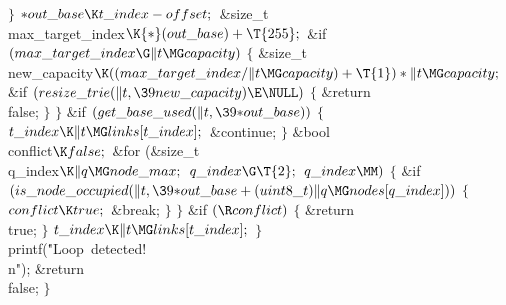\4${}\}{}$\2\6
${}{*}\\{out\_base}\K\\{t\_index}-\\{offset};{}$\7
\&{size\_t} \\{max\_target\_index}${}\K{*}(\\{out\_base})+\T{255};{}$\7
\&{if} ${}(\\{max\_target\_index}\G\|t\MG\\{capacity}){}$\5
${}\{{}$\1\6
\&{size\_t} \\{new\_capacity}${}\K((\\{max\_target\_index}/\|t\MG\\{capacity})+%
\T{1})*\|t\MG\\{capacity};{}$\7
\&{if} ${}(\\{resize\_trie}(\|t,\39\\{new\_capacity})\E\NULL){}$\5
${}\{{}$\1\6
\&{return} \\{false};\6
\4${}\}{}$\2\6
\4${}\}{}$\2\6
\&{if} ${}(\\{get\_base\_used}(\|t,\39{*}\\{out\_base})){}$\5
${}\{{}$\1\6
${}\\{t\_index}\K\|t\MG\\{links}[\\{t\_index}];{}$\6
\&{continue};\6
\4${}\}{}$\2\7
\&{bool} \\{conflict}${}\K\\{false};{}$\7
\&{for} (\&{size\_t} \\{q\_index}${}\K\|q\MG\\{node\_max};{}$ ${}\\{q\_index}\G%
\T{2};{}$ ${}\\{q\_index}\MM){}$\5
${}\{{}$\1\6
\&{if} ${}(\\{is\_node\_occupied}(\|t,\39{*}\\{out\_base}+(\\{uint8\_t})\|q\MG%
\\{nodes}[\\{q\_index}])){}$\5
${}\{{}$\1\6
${}\\{conflict}\K\\{true};{}$\6
\&{break};\6
\4${}\}{}$\2\6
\4${}\}{}$\2\6
\&{if} ${}(\R\\{conflict}){}$\5
${}\{{}$\1\6
\&{return} \\{true};\6
\4${}\}{}$\2\6
${}\\{t\_index}\K\|t\MG\\{links}[\\{t\_index}];{}$\6
\4${}\}{}$\2\6
\\{printf}(\.{"Loop\ detected!\\n"});\6
\&{return} \\{false};\6
\4${}\}{}$\2\par
\fi

